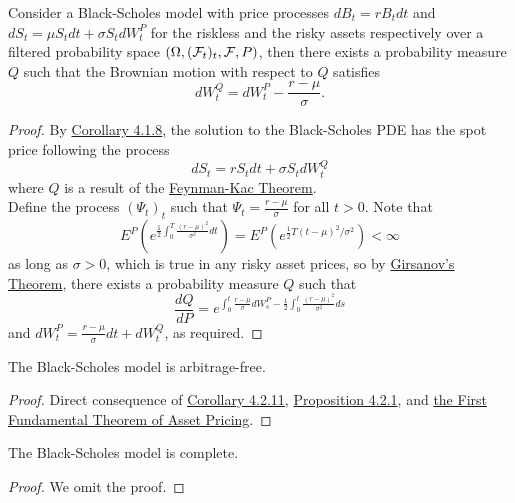 \documentclass[11pt,fleqn]{book} %
\begin{document}
\begin{corollary} \label{cor:4211}
Consider a Black-Scholes model with price processes \(dB_t = rB_tdt\) and \(dS_t = \mu S_tdt + \sigma S_tdW_t^P\) for the riskless and the risky assets respectively over a filtered probability space \((\Omega, (\mathcal{F}_t)_t, \mathcal{F}, P)\), then there exists a probability measure \(Q\) such that the Brownian motion with respect to \(Q\) satisfies
\[
dW_t^Q = dW_t^P - \frac{r - \mu}{\sigma}.
\]
\end{corollary}
\begin{proof}
By \hyperref[cor:418]{Corollary 4.1.8}, the solution to the Black-Scholes PDE has the spot price following the process
\[
dS_t = rS_tdt + \sigma S_tdW_t^Q
\]
where \(Q\) is a result of the \hyperref[thm:415]{Feynman-Kac Theorem}. \\
\indent Define the process \((\Psi_t)_t\) such that \(\Psi_t = \frac{r - \mu}{\sigma}\) for all \(t > 0\). Note that
\[
E^P\left(e^{\frac12\int_0^T\frac{(r - \mu)^2}{\sigma^2}dt}\right) = E^P\left(e^{\frac12T(t - \mu)^2/\sigma^2}\right) < \infty
\]
as long as \(\sigma > 0\), which is true in any risky asset prices, so by \hyperref[thm:429]{Girsanov's Theorem}, there exists a probability measure \(Q\) such that
\[
\frac{dQ}{dP} = e^{\int_0^t\frac{r - \mu}{\sigma}dW_s^P - \frac12\int_0^t\frac{(r - \mu)^2}{\sigma^2}ds}
\]
and \(dW_t^P = \frac{r - \mu}{\sigma}dt + dW_t^Q\), as required.
\end{proof}

\begin{corollary} \label{cor:4212}
The Black-Scholes model is arbitrage-free.
\end{corollary}
\begin{proof} Direct consequence of \hyperref[cor:4211]{Corollary 4.2.11}, \hyperref[prop:421]{Proposition 4.2.1}, and \hyperref[thm:426]{the First Fundamental Theorem of Asset Pricing}.
\end{proof}

\begin{theorem} \label{thm:4213}
The Black-Scholes model is complete.
\end{theorem}
\begin{proof} We omit the proof. \end{proof}
\end{document}
